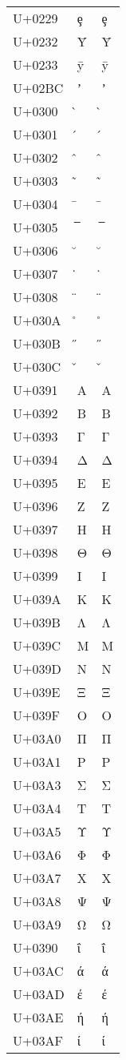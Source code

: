 \documentclass{article}
\begin{document}
\begin{longtable}{lll}
U+0229 & ȩ & ȩ \\
U+0232 & Ȳ & Ȳ \\
U+0233 & ȳ & ȳ \\
U+02BC & ʼ & ʼ \\
U+0300 & ̀ & ̀ \\
U+0301 & ́ & ́ \\
U+0302 & ̂ & ̂ \\
U+0303 & ̃ & ̃ \\
U+0304 & ̄ & ̄ \\
U+0305 & ̅ & ̅ \\
U+0306 & ̆ & ̆ \\
U+0307 & ̇ & ̇ \\
U+0308 & ̈ & ̈ \\
U+030A & ̊ & ̊ \\
U+030B & ̋ & ̋ \\
U+030C & ̌ & ̌ \\
U+0391 & Α & Α \\
U+0392 & Β & Β \\
U+0393 & Γ & Γ \\
U+0394 & Δ & Δ \\
U+0395 & Ε & Ε \\
U+0396 & Ζ & Ζ \\
U+0397 & Η & Η \\
U+0398 & Θ & Θ \\
U+0399 & Ι & Ι \\
U+039A & Κ & Κ \\
U+039B & Λ & Λ \\
U+039C & Μ & Μ \\
U+039D & Ν & Ν \\
U+039E & Ξ & Ξ \\
U+039F & Ο & Ο \\
U+03A0 & Π & Π \\
U+03A1 & Ρ & Ρ \\
U+03A3 & Σ & Σ \\
U+03A4 & Τ & Τ \\
U+03A5 & Υ & Υ \\
U+03A6 & Φ & Φ \\
U+03A7 & Χ & Χ \\
U+03A8 & Ψ & Ψ \\
U+03A9 & Ω & Ω \\
U+0390 & ΐ & ΐ \\
U+03AC & ά & ά \\
U+03AD & έ & έ \\
U+03AE & ή & ή \\
U+03AF & ί & ί \\

\end{longtable}
\end{document}
